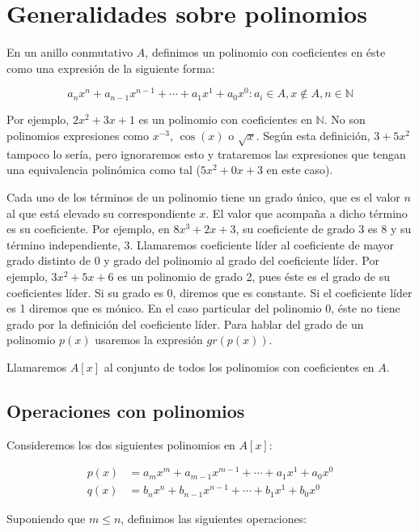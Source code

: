 \section{Generalidades sobre polinomios}\label{generalidades-sobre-polinomios}

En un anillo conmutativo $A$, definimos un polinomio con coeficientes en éste como una expresión de la siguiente forma:

\[a_{n}x^{n} + a_{n-1}x^{n-1} + \cdots + a_{1}x^{1} + a_{0}x^{0} : a_i \in A, x \notin A, n \in\mathbb{N}\]

Por ejemplo, $2x^2 + 3x + 1$ es un polinomio con coeficientes en $\mathbb{N}$.
No son polinomios expresiones como $x^{-3}$, $\cos(x)$ o $\sqrt{x}$.
Según esta definición, $3 + 5x^2$ tampoco lo sería, pero ignoraremos esto y trataremos las expresiones que tengan una equivalencia polinómica como tal ($5x^2 + 0x + 3$ en este caso).

Cada uno de los términos de un polinomio tiene un grado único, que es el valor $n$ al que está elevado su correspondiente $x$.
El valor que acompaña a dicho término es su coeficiente.
Por ejemplo, en $8x^3 + 2x + 3$, su coeficiente de grado 3 es 8 y su término independiente, 3.
Llamaremos coeficiente líder al coeficiente de mayor grado distinto de 0 y grado del polinomio al grado del coeficiente líder.
Por ejemplo, $3x^2 + 5x + 6$ es un polinomio de grado 2, pues éste es el grado de su coeficientes líder.
Si su grado es 0, diremos que es constante.
Si el coeficiente líder es 1 diremos que es mónico.
En el caso particular del polinomio 0, éste no tiene grado por la definición del coeficiente líder.
Para hablar del grado de un polinomio $p(x)$ usaremos la expresión $gr(p(x))$.

Llamaremos $A[x]$ al conjunto de todos los polinomios con coeficientes en $A$.

\subsection{Operaciones con polinomios}

Consideremos los dos siguientes polinomios en $A[x]$:

\[
\begin{array}{ll}
	p(x) & = a_{m}x^{m} + a_{m-1}x^{m-1} + \cdots + a_{1}x^{1} + a_{0}x^{0} \\
	q(x) & = b_{n}x^{n} + b_{n-1}x^{n-1} + \cdots + b_{1}x^{1} + b_{0}x^{0}
\end{array}
\]

Suponiendo que $m \leq n$, definimos las siguientes operaciones:

